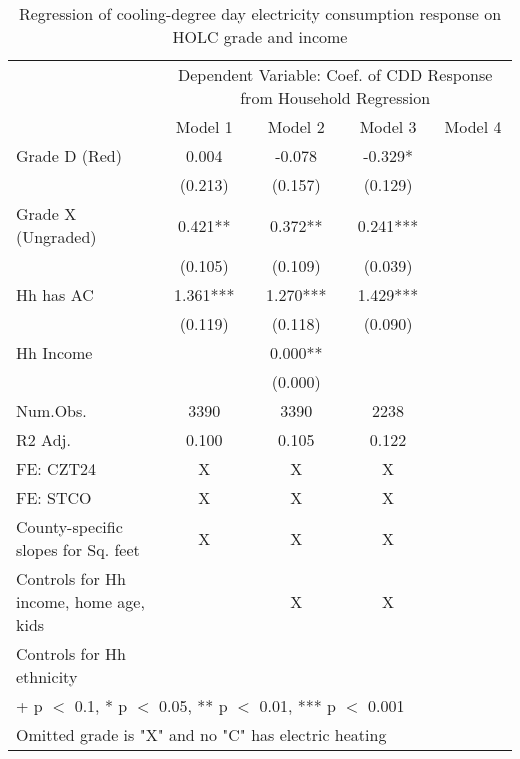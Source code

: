 \documentclass[border=1mm, preview]{standalone}
\begin{document}
\begin{table}

\caption{Regression of cooling-degree day electricity consumption response on HOLC grade and income\label{tab:responseelectric1}}
\centering
\begin{tabular}[t]{lccc>{}c}
\toprule
\multicolumn{1}{c}{ } & \multicolumn{4}{c}{Dependent Variable: Coef. of CDD Response from Household Regression} \\
\cmidrule(l{3pt}r{3pt}){2-5}
  & Model 1 & Model 2 & Model 3 & Model 4\\
\midrule
Grade D (Red) & 0.004 & -0.078 & -0.329* & \cellcolor{blue}{\textcolor{white}{-0.507***}}\\
 & (0.213) & (0.157) & (0.129) & \cellcolor{blue}{\textcolor{white}{(0.073)}}\\
Grade X (Ungraded) & 0.421** & 0.372** & 0.241*** & \cellcolor{blue}{\textcolor{white}{0.133}}\\
 & (0.105) & (0.109) & (0.039) & \cellcolor{blue}{\textcolor{white}{(0.134)}}\\
Hh has AC & 1.361*** & 1.270*** & 1.429*** & \cellcolor{blue}{\textcolor{white}{1.343***}}\\
 & (0.119) & (0.118) & (0.090) & \cellcolor{blue}{\textcolor{white}{(0.134)}}\\
Hh Income &  & 0.000** &  & \cellcolor{blue}{\textcolor{white}{0.000*}}\\
 &  & (0.000) &  & \cellcolor{blue}{\textcolor{white}{(0.000)}}\\
\midrule
Num.Obs. & 3390 & 3390 & 2238 & \cellcolor{blue}{\textcolor{white}{2172}}\\
R2 Adj. & 0.100 & 0.105 & 0.122 & \cellcolor{blue}{\textcolor{white}{0.140}}\\
FE: CZT24 & X & X & X & \cellcolor{blue}{\textcolor{white}{X}}\\
FE: STCO & X & X & X & \cellcolor{blue}{\textcolor{white}{X}}\\
County-specific slopes for Sq. feet & X & X & X & \cellcolor{blue}{\textcolor{white}{X}}\\
Controls for Hh income, home age, kids &  & X & X & \cellcolor{blue}{\textcolor{white}{X}}\\
Controls for Hh ethnicity &  &  &  & \cellcolor{blue}{\textcolor{white}{X}}\\
\bottomrule
\multicolumn{5}{l}{\textsuperscript{} + p $<$ 0.1, * p $<$ 0.05, ** p $<$ 0.01, *** p $<$ 0.001}\\
\multicolumn{5}{l}{\textsuperscript{} Omitted grade is "X" and no "C" has electric heating}\\
\end{tabular}
\end{table}
\end{document}
